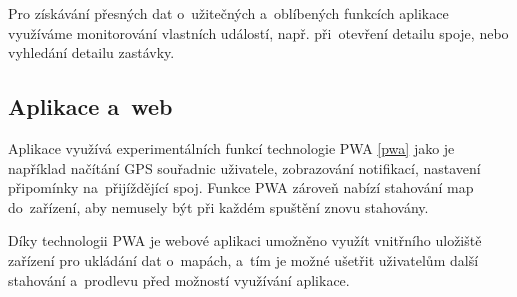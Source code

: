 Pro získávání přesných dat o~užitečných a~oblíbených funkcích aplikace využíváme monitorování vlastních událostí, např. při~otevření detailu spoje, nebo vyhledání detailu zastávky.
\subsection{Aplikace a~web}
Aplikace využívá experimentálních funkcí technologie PWA \ref{pwa} jako je například načítání GPS souřadnic uživatele, zobrazování notifikací, nastavení připomínky na~přijíždějící spoj. Funkce PWA zároveň nabízí stahování map do~zařízení, aby nemusely být při každém spuštění znovu stahovány.

Díky technologii PWA je webové aplikaci umožněno využít vnitřního uložiště zařízení pro ukládání dat o~mapách, a~tím je možné ušetřit uživatelům další stahování a~prodlevu před možností využívání aplikace.
